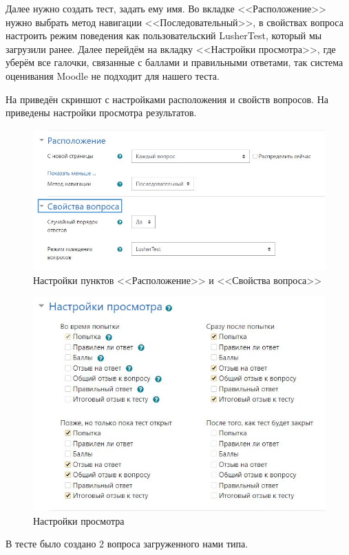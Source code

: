 Далее нужно создать тест, задать ему имя. Во вкладке <<Расположение>> нужно выбрать метод навигации <<Последовательный>>, в свойствах вопроса настроить режим поведения как пользовательский LusherTest, который мы загрузили ранее. Далее перейдём на вкладку <<Настройки просмотра>>, где уберём все галочки, связанные с баллами и правильными ответами, так система оценивания Moodle не подходит для нашего теста.

На  приведён скриншот с настройками расположения и свойств вопросов.
На  приведены настройки просмотра результатов.
\FloatBarrier %
\begin{figure}[ht] 
	\center
	\includegraphics [scale=0.5] {my_folder/images/setting1}
	\caption{Настройки пунктов <<Расположение>> и <<Свойства вопроса>>} 
	\label{fig:set1}  
\end{figure}
\FloatBarrier %
\FloatBarrier %
\begin{figure}[ht] 
	\center
	\includegraphics [scale=0.7] {my_folder/images/setting2}
	\caption{Настройки просмотра} 
	\label{fig:set2}  
\end{figure}
\FloatBarrier %
В тесте было создано 2 вопроса загруженного нами типа.


